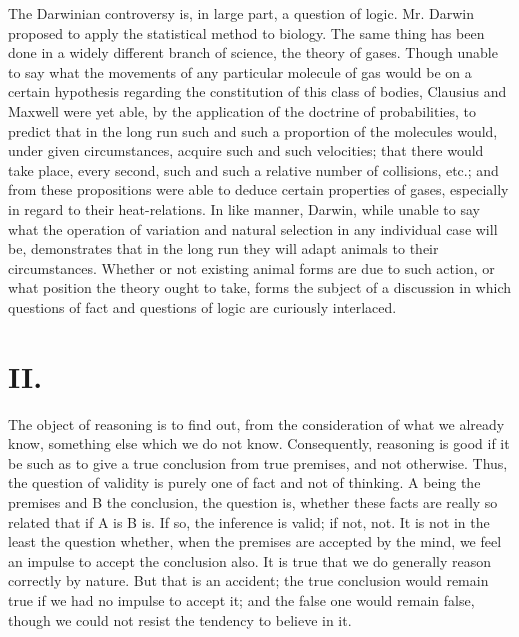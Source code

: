 The Darwinian controversy is, in large part, a question of logic. Mr.
Darwin proposed to apply the statistical method to biology. The same
thing has been done in a widely different branch of science, the
 theory of gases. Though unable to say what the movements of
any particular molecule of gas would be on a certain hypothesis
regarding the constitution of this class of bodies, Clausius and
Maxwell were yet able, by the application of the doctrine of
probabilities, to predict that in the long run such and such a
proportion of the molecules would, under given circumstances, acquire
such and such velocities; that there would take place, every second,
such and such a relative number of collisions, etc.; and from these
propositions were able to deduce certain properties of gases,
especially in regard to their heat-relations. In like manner, Darwin,
while unable to say what the operation of variation and natural
selection in any individual case will be, demonstrates that in the
long run they will adapt animals to their circumstances. Whether or
not existing animal forms are due to such action, or what position the
theory ought to take, forms the subject of a discussion in which
questions of fact and questions of logic are curiously interlaced.

\section*{II.}

The object of reasoning is to find out, from the consideration of what
we already know, something else which we do not know. Consequently,
reasoning is good if it be such as to give a true conclusion from true
premises, and not otherwise. Thus, the question of validity is purely
one of fact and not of thinking. A being the premises and B the
conclusion, the question is, whether these facts are really so related
that if A is B is. If so, the inference is valid; if not, not. It is
not in the least the question whether, when the premises are accepted
by the mind, we feel an impulse to accept the conclusion also. It is
true that we do generally reason correctly by nature. But that is an
accident; the true conclusion would remain true if we had no impulse
to accept it; and the false one would remain false, though we could
not resist the tendency to believe in it.


